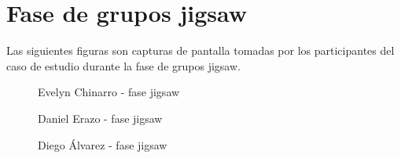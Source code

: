 \section{Fase de grupos jigsaw}
Las siguientes figuras son capturas de pantalla tomadas por los participantes del caso de estudio durante la fase de grupos jigsaw.
\begin{figure}[h]
	\centering
	\caption{Evelyn Chinarro - fase jigsaw}
	\label{fig:evy_fase_jigsaw}
\end{figure}
\begin{figure}[h]
	\centering
	\caption{Daniel Erazo - fase jigsaw}
	\label{fig:daniel_fase_jigsaw}
\end{figure}
\begin{figure}[h]
	\centering
	\caption{Diego Álvarez - fase jigsaw}
	\label{fig:diego_fase_jigsaw}
\end{figure}
